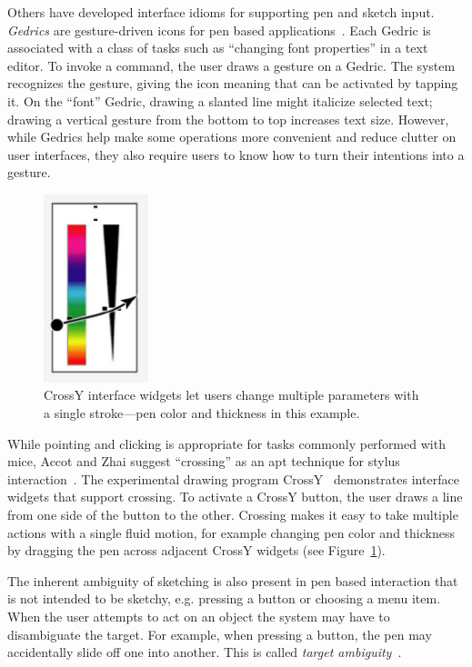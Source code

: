 Others have developed interface idioms for supporting pen and sketch
input. \textit{Gedrics} are gesture-driven icons for pen based
applications~\cite{geissler-gedrics}. Each Gedric is associated with a
class of tasks such as ``changing font properties'' in a text
editor. To invoke a command, the user draws a gesture on a Gedric. The
system recognizes the gesture, giving the icon meaning that can be
activated by tapping it. On the ``font'' Gedric, drawing a slanted
line might italicize selected text; drawing a vertical gesture from
the bottom to top increases text size. However, while Gedrics help
make some operations more convenient and reduce clutter on user
interfaces, they also require users to know how to turn their
intentions into a gesture. 

\begin{figure}
   \centering
   \includegraphics[width=1.2in]{img/crossy.pdf} 
   \caption{CrossY interface widgets let users change multiple
   parameters with a single stroke---pen color and thickness in
   this example.}
   \label{fig:crossy}
\end{figure}

While pointing and clicking is appropriate for tasks commonly
performed with mice, Accot and Zhai suggest ``crossing'' as an apt
technique for stylus interaction~\cite{accot-crossing}. The
experimental drawing program CrossY~\cite{apitz-crossy} demonstrates
interface widgets that support crossing. To activate a CrossY button,
the user draws a line from one side of the button to the
other. Crossing makes it easy to take multiple actions with a single
fluid motion, for example changing pen color and thickness by dragging
the pen across adjacent CrossY widgets (see Figure~\ref{fig:crossy}).

The inherent ambiguity of sketching is also present in pen based
interaction that is not intended to be sketchy, e.g. pressing a button
or choosing a menu item. When the user attempts to act on an object
the system may have to disambiguate the target. For example, when
pressing a button, the pen may accidentally slide off one into
another. This is called \textit{target
ambiguity}~\cite{mankoff-burlap,mankoff-oops}.

